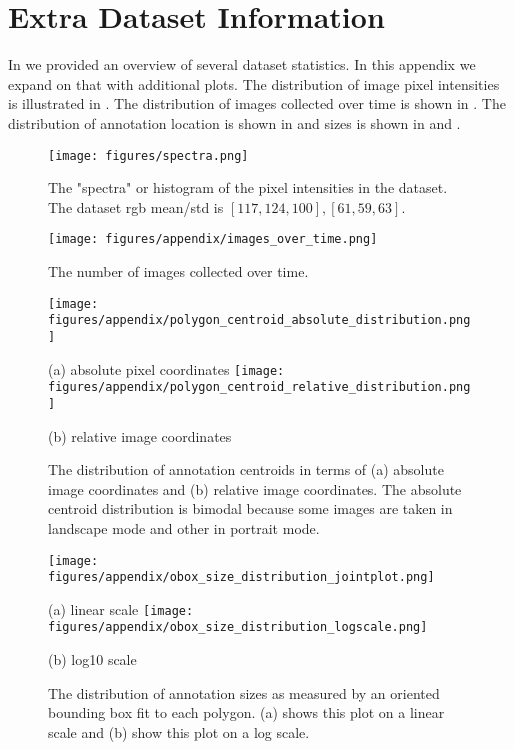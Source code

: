 

\appendix

\section{Extra Dataset Information}

In  we provided an overview of several dataset statistics.
In this appendix we expand on that with additional plots.
The distribution of image pixel intensities is illustrated in .
The distribution of images collected over time is shown in .
The distribution of annotation location is shown in  and sizes is shown
  in  and .


\begin{figure}[ht]
\centering
\texttt{[image: figures/spectra.png]}
\caption[]{
    The "spectra" or histogram of the pixel intensities in the dataset. 
    The dataset rgb  mean/std is $[117, 124, 100], [61, 59, 63]$.
}
\label{fig:spectra}
\end{figure}


\begin{figure}[ht]
\centering
\texttt{[image: figures/appendix/images\_over\_time.png]}
\caption[]{
    The number of images collected over time.
}
\label{fig:images_over_time}
\end{figure}


\begin{figure}[ht]
\centering
\texttt{[image: figures/appendix/polygon\_centroid\_absolute\_distribution.png]}

(a) absolute pixel coordinates
\texttt{[image: figures/appendix/polygon\_centroid\_relative\_distribution.png]}

(b) relative image coordinates
\caption[]{
    The distribution of annotation centroids in terms of (a) absolute image
    coordinates and (b) relative image coordinates.
    The absolute centroid distribution is bimodal because some images are taken
    in landscape mode and other in portrait mode.
}
\label{fig:centroid_location_distri}
\end{figure}


\begin{figure}[ht]
\centering
\texttt{[image: figures/appendix/obox\_size\_distribution\_jointplot.png]}%

(a) linear scale
\texttt{[image: figures/appendix/obox\_size\_distribution\_logscale.png]}%

(b) log10 scale
\caption[]{
    The distribution of annotation sizes as measured by an oriented bounding box fit to each polygon.
    (a) shows this plot on a linear scale and (b) show this plot on a log scale.
}
\label{fig:annot_obox_size_dist}
\end{figure}


